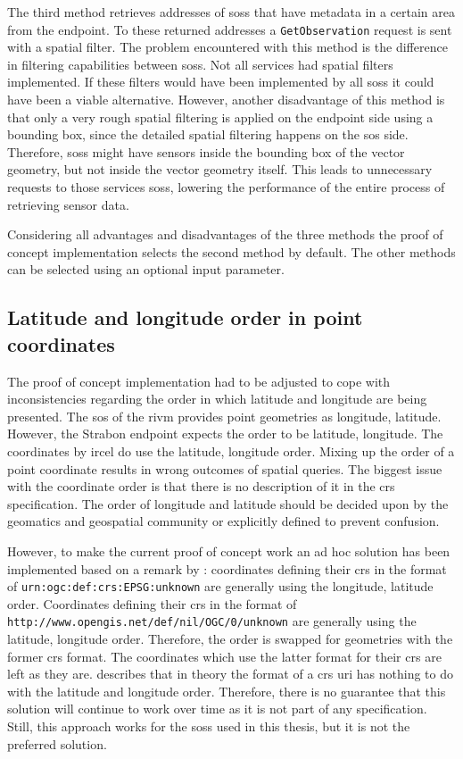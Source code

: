 The third method retrieves addresses of \aclp{sos} that have metadata in a certain area from the endpoint. To these returned addresses a \texttt{GetObservation} request is sent with a spatial filter. The problem encountered with this method is the difference in filtering capabilities between \aclp{sos}. Not all services had spatial filters implemented. If these filters would have been implemented by all \aclp{sos} it could have been a viable alternative. However, another disadvantage of this method is that only a very rough spatial filtering is applied on the endpoint side using a bounding box, since the detailed spatial filtering happens on the \ac{sos} side. Therefore, \aclp{sos} might have sensors inside the bounding box of the vector geometry, but not inside the vector geometry itself. This leads to unnecessary requests to those services \aclp{sos}, lowering the performance of the entire process of retrieving sensor data.

Considering all advantages and disadvantages of the three methods the proof of concept implementation selects the second method by default. The other methods can be selected using an optional input parameter. 

\subsection{Latitude and longitude order in point coordinates}
The proof of concept implementation had to be adjusted to cope with inconsistencies regarding the order in which latitude and longitude are being presented. The \ac{sos} of the \ac{rivm} provides point geometries as longitude, latitude. However, the Strabon endpoint expects the order to be latitude, longitude. The coordinates by \ac{ircel} do use the latitude, longitude order. Mixing up the order of a point coordinate results in wrong outcomes of spatial queries. The biggest issue with the coordinate order is that there is no description of it in the \ac{crs} specification.  The order of longitude and latitude should be decided upon by the geomatics and geospatial community or explicitly defined to prevent confusion. 

However, to make the current proof of concept work an ad hoc solution has been implemented based on a remark by \cite{GEO:GDAL}: coordinates defining their \ac{crs} in the format of \texttt{urn:ogc:def:crs:EPSG:unknown} are generally using the longitude, latitude order. Coordinates defining their \ac{crs} in the format of \texttt{http://www.opengis.net/def/nil/OGC/0/unknown} are generally using the latitude, longitude order. Therefore, the order is swapped for geometries with the former \ac{crs} format. The coordinates which use the latter format for their \ac{crs} are left as they are. \cite{GEO:TOOLS} describes that in theory the format of a \ac{crs} \ac{uri} has nothing to do with the latitude and longitude order. Therefore, there is no guarantee that this solution will continue to work over time as it is not part of any specification. Still, this approach works for the \aclp{sos} used in this thesis, but it is not the preferred solution.   

